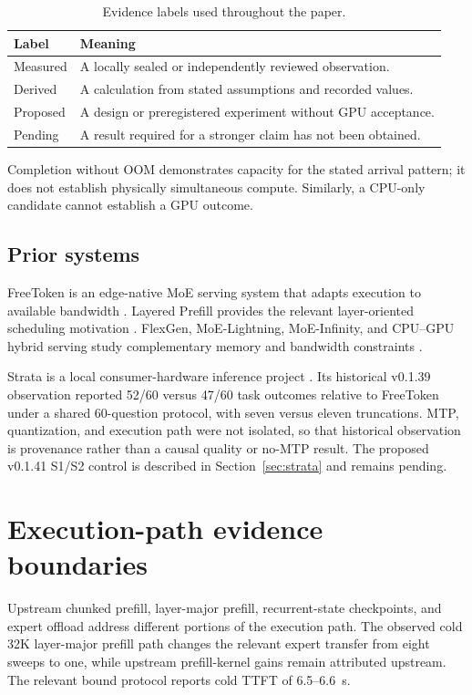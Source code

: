 \documentclass[11pt]{article}
\begin{document}
\begin{table}[t]
\centering
\small
\begin{tabular}{ll}
\toprule
Label & Meaning \\
\midrule
Measured & A locally sealed or independently reviewed observation. \\
Derived & A calculation from stated assumptions and recorded values. \\
Proposed & A design or preregistered experiment without GPU acceptance. \\
Pending & A result required for a stronger claim has not been obtained. \\
\bottomrule
\end{tabular}
\caption{Evidence labels used throughout the paper.}
\label{tab:labels}
\end{table}

Completion without OOM demonstrates capacity for the stated arrival pattern; it does not establish physically simultaneous compute. Similarly, a CPU-only candidate cannot establish a GPU outcome.

\subsection{Prior systems}

FreeToken is an edge-native MoE serving system that adapts execution to available bandwidth \cite{freetoken}. Layered Prefill provides the relevant layer-oriented scheduling motivation \cite{layeredprefill}. FlexGen, MoE-Lightning, MoE-Infinity, and CPU--GPU hybrid serving study complementary memory and bandwidth constraints \cite{flexgen,moelightning,moeinfinity,hybrid}.

Strata is a local consumer-hardware inference project \cite{strata}. Its historical v0.1.39 observation reported 52/60 versus 47/60 task outcomes relative to FreeToken under a shared 60-question protocol, with seven versus eleven truncations. MTP, quantization, and execution path were not isolated, so that historical observation is provenance rather than a causal quality or no-MTP result. The proposed v0.1.41 S1/S2 control is described in Section~\ref{sec:strata} and remains pending.

\section{Execution-path evidence boundaries}

Upstream chunked prefill, layer-major prefill, recurrent-state checkpoints, and expert offload address different portions of the execution path. The observed cold 32K layer-major prefill path changes the relevant expert transfer from eight sweeps to one, while upstream prefill-kernel gains remain attributed upstream. The relevant bound protocol reports cold TTFT of 6.5--6.6~s.
\end{document}
